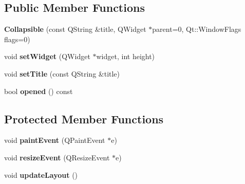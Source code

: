 \subsection*{Public Member Functions}
\begin{DoxyCompactItemize}
\item 
\hypertarget{class_collapsible_ae464d43cb18988f23ee3c3a9b6a9a282}{{\bfseries Collapsible} (const Q\-String \&title, Q\-Widget $\ast$parent=0, Qt\-::\-Window\-Flags flags=0)}\label{class_collapsible_ae464d43cb18988f23ee3c3a9b6a9a282}

\item 
\hypertarget{class_collapsible_acb3711fba6b264176708770b9d5e77ce}{void {\bfseries set\-Widget} (Q\-Widget $\ast$widget, int height)}\label{class_collapsible_acb3711fba6b264176708770b9d5e77ce}

\item 
\hypertarget{class_collapsible_a62ffe8a22973b819ceb54a365968d643}{void {\bfseries set\-Title} (const Q\-String \&title)}\label{class_collapsible_a62ffe8a22973b819ceb54a365968d643}

\item 
\hypertarget{class_collapsible_a809d3ceebbc8e0d9e6f5b3368470dd20}{bool {\bfseries opened} () const }\label{class_collapsible_a809d3ceebbc8e0d9e6f5b3368470dd20}

\end{DoxyCompactItemize}
\subsection*{Protected Member Functions}
\begin{DoxyCompactItemize}
\item 
\hypertarget{class_collapsible_af582f0957fa4d8695a03cd23b0a13bb1}{void {\bfseries paint\-Event} (Q\-Paint\-Event $\ast$e)}\label{class_collapsible_af582f0957fa4d8695a03cd23b0a13bb1}

\item 
\hypertarget{class_collapsible_a5f00563913ce0af8c9467dc2b452ebfe}{void {\bfseries resize\-Event} (Q\-Resize\-Event $\ast$e)}\label{class_collapsible_a5f00563913ce0af8c9467dc2b452ebfe}

\item 
\hypertarget{class_collapsible_a338ab59f192a08c6b8fd615617a5d817}{void {\bfseries update\-Layout} ()}\label{class_collapsible_a338ab59f192a08c6b8fd615617a5d817}

\end{DoxyCompactItemize}


